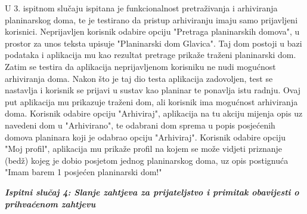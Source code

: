  		U 3. ispitnom slučaju ispitana je funkcionalnost pretraživanja i arhiviranja planinarskog doma, te je testirano da pristup arhiviranju imaju samo prijavljeni korisnici. Neprijavljen korisnik odabire opciju "Pretraga planinarskih domova", u prostor za unos teksta upisuje "Planinarski dom Glavica". Taj dom postoji u bazi podataka i aplikacija mu kao rezultat pretrage prikaže traženi planinarski dom. Zatim se testira da aplikacija neprijavljenom korisniku ne nudi mogućnost arhiviranja doma. Nakon što je taj dio testa aplikacija zadovoljen, test se nastavlja i korisnik se prijavi u sustav kao planinar te ponavlja istu radnju. Ovaj put aplikacija mu prikazuje traženi dom, ali korisnik ima mogućnost arhiviranja doma. Korisnik odabire opciju "Arhiviraj", aplikacija na tu akciju mijenja opis uz navedeni dom u "Arhivirano", te odabrani dom sprema u popis posjećenih domova planinara koji je odabrao opciju "Arhiviraj". Korisnik odabire opciju "Moj profil", aplikacija mu prikaže profil na kojem se može vidjeti priznanje (bedž) kojeg je dobio posjetom jednog planinarskog doma, uz opis postignuća "Imam barem 1 posjećen planinarski dom!"\newline
 		
 		 	\textbf{\textit{Ispitni slučaj 4: Slanje zahtjeva za prijateljstvo i primitak obavijesti o prihvaćenom zahtjevu}}
 		
